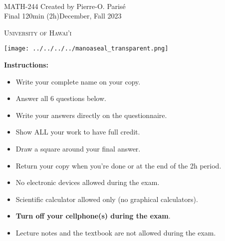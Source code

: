 \documentclass[addpoints, 12pt]{exam}%
\theoremstyle{definition}
\begin{document}
	\noindent \hrulefill \\
	\noindent MATH-244 \hfill Created by Pierre-O. Paris{\'e}\\
	Final 120min (2h)\hfill December, Fall 2023\\\vspace*{-0.7cm}

\noindent\hrulefill

\vspace*{0.5cm}

\begin{center}
\begin{minipage}{0.6\textwidth}
\begin{Huge}
\textsc{University of Hawai'i}
\end{Huge}
\end{minipage}
\begin{minipage}{0.12\textwidth}
\texttt{[image: ../../../../manoaseal\_transparent.png]}
\end{minipage}
\end{center}
	
\vspace*{0.5cm}

\noindent{}

\vspace*{0.5cm}

\noindent{}

\vspace*{1cm}

\begin{center}
\gradetable[h][questions]
\end{center}

\vspace*{1cm}

\noindent\textbf{Instructions:} 

\begin{itemize}
\item Write your complete name on your copy. 
\item Answer all 6 questions below.
\item Write your answers directly on the questionnaire.
\item Show ALL your work to have full credit.
\item Draw a square around your final answer.
\item Return your copy when you're done or at the end of the 2h period. 
\item No electronic devices allowed during the exam. 
\item Scientific calculator allowed only (no graphical calculators).
\item \textbf{Turn off your cellphone(s) during the exam}.
\item Lecture notes and the textbook are not allowed during the exam. 
\end{itemize}
\end{document}
